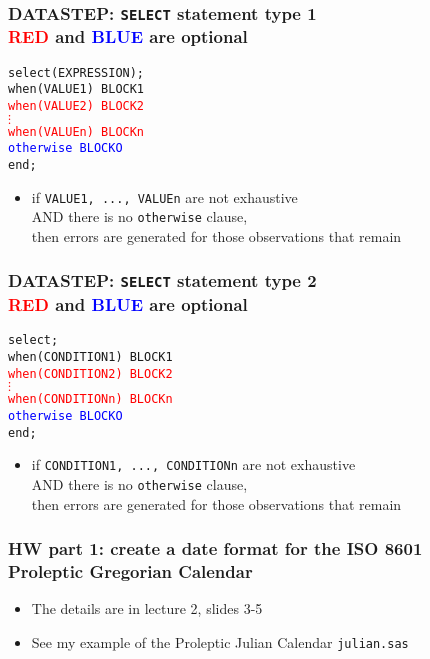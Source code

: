 \documentclass[11pt,pdftex,dvipsnames,usenames,helvetica]{beamer}
\begin{document}
\begin{frame}[fragile]
\frametitle{DATASTEP: {\tt SELECT} statement type 1\\
\textcolor{red}{RED} and
\textcolor{blue}{BLUE} are optional}
{\tt select(EXPRESSION);\\
when(VALUE1) BLOCK1\\
\textcolor{red}{when(VALUE2) BLOCK2\\
\qquad $\vdots$\\
when(VALUEn) BLOCKn}\\
\textcolor{blue}{otherwise BLOCKO}\\
end;}
\begin{itemize}
\item if {\tt VALUE1, ..., VALUEn} are not exhaustive\\
AND there is no {\tt otherwise} clause,\\ then errors
are generated for those observations that remain
\end{itemize}
\end{frame}

\begin{frame}[fragile]
\frametitle{DATASTEP: {\tt SELECT} statement type 2\\
\textcolor{red}{RED} and
\textcolor{blue}{BLUE} are optional}
{\tt select;\\
when(CONDITION1) BLOCK1\\
\textcolor{red}{when(CONDITION2) BLOCK2\\
\qquad $\vdots$\\
when(CONDITIONn) BLOCKn}\\
\textcolor{blue}{otherwise BLOCKO}\\
end;}
\begin{itemize}
\item if {\tt CONDITION1, ..., CONDITIONn} are not exhaustive\\
AND there is no {\tt otherwise} clause,\\ then errors
are generated for those observations that remain
\end{itemize}
\end{frame}

\begin{frame}[fragile]
\frametitle{HW part 1: create a date format for the ISO 8601\\
 Proleptic Gregorian Calendar}
\begin{itemize}
\item The details are in lecture 2, slides 3-5
\item See my example of the Proleptic Julian Calendar
{\tt julian.sas}
\end{itemize}
\end{frame}
\end{document}
